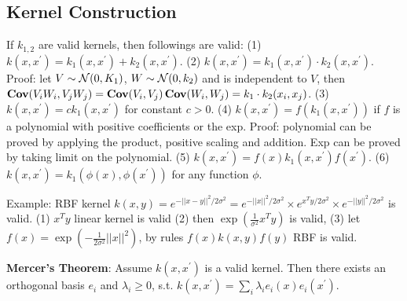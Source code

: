 \subsection*{Kernel Construction}
If $k_{1,2}$ are valid kernels, then followings are valid: (1) $k(x, x^\prime) = k_1(x, x^\prime) + k_2(x, x^\prime)$. (2) $k(x, x^\prime) = k_1(x, x^\prime)\cdot k_2(x, x^\prime)$. Proof: let $V\sim \mathcal{N}(0, K_1)$, $W\sim \mathcal{N}(0, k_2)$ and is independent to $V$, then $\operatorname{\textbf{Cov}}(V_i W_i, V_j W_j) = \operatorname{\textbf{Cov}}(V_i, V_j)\operatorname{\textbf{Cov}}(W_i, W_j) = k_1\cdot k_2(x_i, x_j)$. (3) $k(x, x^\prime) = c k_1(x, x^\prime)$ for constant $c>0$. (4) $k(x, x^\prime) = f(k_1(x, x^\prime))$ if $f$ is a polynomial with positive coefficients or the exp. Proof: polynomial can be proved by applying the product, positive scaling and addition. Exp can be proved by taking limit on the polynomial. (5) $k(x, x^\prime) = f(x) k_1(x, x^\prime) f(x^\prime)$. (6) $k(x, x^\prime) = k_1(\phi(x), \phi(x^\prime))$ for any function $\phi$.


Example: RBF kernel $k(x,y) = e^{-||x-y||^2/2\sigma^2} = e^{-||x||^2/2\sigma^2}\times e^{x^T y/2\sigma^2} \times e^{-||y||^2/2\sigma^2}$ is valid. (1) $x^T y$ linear kernel is valid (2) then $\exp(\frac{1}{\sigma^2}x^T y)$ is valid, (3) let $f(x) = \exp(-\frac{1}{2\sigma^2} ||x||^2)$, by rules $f(x) k(x, y) f(y)$ RBF is valid.

\textbf{Mercer's Theorem}: Assume $k(x, x^\prime)$ is a valid kernel. Then there exists an orthogonal basis $e_i$ and $\lambda_i\ge 0$, s.t. $k(x, x^\prime) = \sum_{i} \lambda_i e_i(x) e_i(x^\prime)$.


